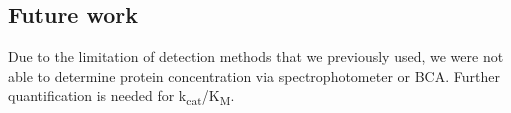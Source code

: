\begin{refsection}
\section{Future work}

Due to the limitation of detection methods that we previously used, we were not
able to determine protein concentration via spectrophotometer or BCA. Further
quantification is needed for k\textsubscript{cat}/K\textsubscript{M}.

%
%
%

\printbibliography[heading=subbibliography]

\end{refsection}

